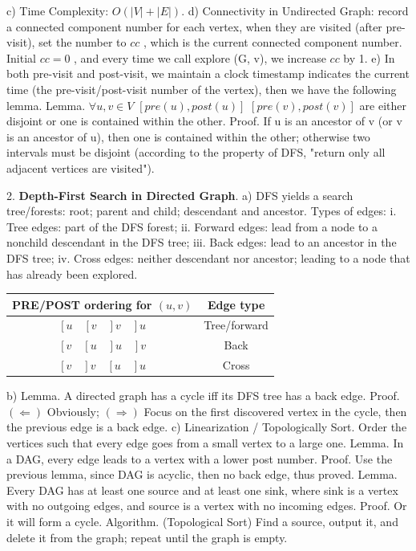 \documentclass[10pt,a4paper]{article}
\begin{document}
c) Time Complexity: \(O(|V| + |E|)\).
d) Connectivity in Undirected Graph: record a connected component number for each vertex, when they are visited (after pre-visit), set the number to \(cc\) , which is the current connected component number. Initial \(cc = 0\) , and every time we call explore (G, v), we increase \(cc\) by 1.
e) In both pre-visit and post-visit, we maintain a clock timestamp indicates the current time (the pre-visit/post-visit number of the vertex), then we have the following lemma.
Lemma. \(\forall u,v\in V\) \([pre(u),post(u)]\) \([pre(v),post(v)]\) are either disjoint or one is contained within the other.
Proof. If u is an ancestor of v (or v is an ancestor of u), then one is contained within the other; otherwise two intervals must be disjoint (according to the property of DFS, "return only all adjacent vertices are visited").

2. \textbf{Depth-First Search in Directed Graph}.
a) DFS yields a search tree/forests: root; parent and child; descendant and ancestor. Types of edges:
    i. Tree edges: part of the DFS forest;
    ii. Forward edges: lead from a node to a nonchild descendant in the DFS tree;
    iii. Back edges: lead to an ancestor in the DFS tree;
    iv. Cross edges: neither descendant nor ancestor; leading to a node that has already been explored.
\begin{center}
\begin{tabular}{|c|c|}
\hline
\textbf{PRE/POST ordering for \((u, v)\)} & \textbf{Edge type} \\
\hline
\([u \quad [v \quad ]v \quad ]u\) & Tree/forward \\
\([v \quad [u \quad ]u \quad ]v\) & Back \\
\([v \quad ]v \quad [u \quad ]u\) & Cross \\
\hline
\end{tabular}
\end{center}
b) Lemma. A directed graph has a cycle iff its DFS tree has a back edge.
Proof. \((\Leftarrow)\) Obviously; \((\Rightarrow)\) Focus on the first discovered vertex in the cycle, then the previous edge is a back edge.
c) Linearization / Topologically Sort. Order the vertices such that every edge goes from a small vertex to a large one.
Lemma. In a DAG, every edge leads to a vertex with a lower post number.
Proof. Use the previous lemma, since DAG is acyclic, then no back edge, thus proved.
Lemma. Every DAG has at least one source and at least one sink, where sink is a vertex with no outgoing edges, and source is a vertex with no incoming edges.
Proof. Or it will form a cycle.
Algorithm. (Topological Sort) Find a source, output it, and delete it from the graph; repeat until the graph is empty.
\end{document}
